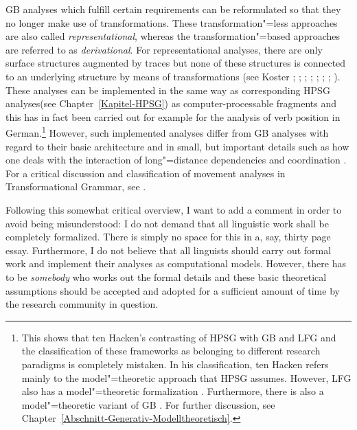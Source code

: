GB analyses\label{Seite-Representationelle-GB} which fulfill certain requirements can be reformulated so that they no longer make use of transformations.
These transformation"=less approaches are also called \emph{representational}, whereas the transformation"=based approaches are referred to as
\emph{derivational}. For representational analyses, there are only surface structures augmented by traces but none of these structures is connected
to an underlying structure by means of transformations (see \eg %
Koster \citeyear[\page ]{Koster78b-u}; \citeyear[]{Koster87a-u}; 
\citealp{KT91a}; \citealp[Section~1.4]{Haider93a}; 
\citealp[]{Frey93a}; \citealp[--88, 177--178]{Lohnstein93a-u}; \citealp[]{FC94a}; \citealp[]{Veenstra98a}).
These analyses can be implemented in the same way as corresponding HPSG analyses\indexhpsg (see
Chapter~\ref{Kapitel-HPSG}) as computer-processable fragments and this has in fact been carried out
for example for the analysis of verb position in German.\footnote{%
	This shows that ten Hacken's contrasting of HPSG with GB and LFG \citep[Section~4.3]{TenHacken2007a}
        and the classification of these frameworks as belonging to different research paradigms is
        completely mistaken. In his classification, ten Hacken refers mainly to the model"=theoretic
        approach that HPSG assumes. However, LFG also has a model"=theoretic formalization
        \citep{Kaplan95a}. Furthermore, there is also a model"=theoretic variant of GB
	\citep{Rogers98a-u}. For further discussion, see Chapter~\ref{Abschnitt-Generativ-Modelltheoretisch}. 
}
However, such implemented analyses differ from GB analyses with regard to their basic architecture and in small, but important details such as how one deals with
the interaction of long"=distance dependencies and coordination \citep{Gazdar81}. For a critical discussion and classification of movement analyses
in Transformational Grammar, see . 

Following this somewhat critical overview, I want to add a comment in order to avoid being misunderstood:
I do not demand that all linguistic work shall be completely formalized. There is simply
no space for this in a, say, thirty page essay. Furthermore, I do not believe that all linguists
should carry out formal work and implement their analyses as computational models. However, there
has to be \emph{somebody} who works out the formal details and these basic theoretical assumptions
should be accepted and adopted for a sufficient amount of time by the research community in
question.



